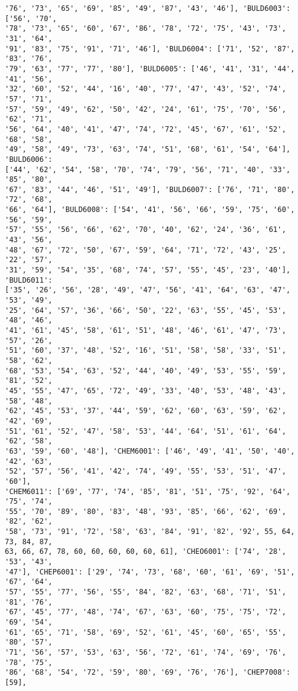 \documentclass[11pt]{article}
\begin{document}
\begin{Verbatim}[commandchars=\\\{\}]
'76', '73', '65', '69', '85', '49', '87', '43', '46'], 'BULD6003': ['56', '70',
'78', '73', '65', '60', '67', '86', '78', '72', '75', '43', '73', '31', '64',
'91', '83', '75', '91', '71', '46'], 'BULD6004': ['71', '52', '87', '83', '76',
'79', '63', '77', '77', '80'], 'BULD6005': ['46', '41', '31', '44', '41', '56',
'32', '60', '52', '44', '16', '40', '77', '47', '43', '52', '74', '57', '71',
'57', '59', '49', '62', '50', '42', '24', '61', '75', '70', '56', '62', '71',
'56', '64', '40', '41', '47', '74', '72', '45', '67', '61', '52', '68', '58',
'49', '58', '49', '73', '63', '74', '51', '68', '61', '54', '64'], 'BULD6006':
['44', '62', '54', '58', '70', '74', '79', '56', '71', '40', '33', '85', '80',
'67', '83', '44', '46', '51', '49'], 'BULD6007': ['76', '71', '80', '72', '68',
'66', '64'], 'BULD6008': ['54', '41', '56', '66', '59', '75', '60', '56', '59',
'57', '55', '56', '66', '62', '70', '40', '62', '24', '36', '61', '43', '56',
'48', '67', '72', '50', '67', '59', '64', '71', '72', '43', '25', '22', '57',
'31', '59', '54', '35', '68', '74', '57', '55', '45', '23', '40'], 'BULD6011':
['35', '26', '56', '28', '49', '47', '56', '41', '64', '63', '47', '53', '49',
'25', '64', '57', '36', '66', '50', '22', '63', '55', '45', '53', '48', '46',
'41', '61', '45', '58', '61', '51', '48', '46', '61', '47', '73', '57', '26',
'51', '60', '37', '48', '52', '16', '51', '58', '58', '33', '51', '58', '62',
'68', '53', '54', '63', '52', '44', '40', '49', '53', '55', '59', '81', '52',
'45', '55', '47', '65', '72', '49', '33', '40', '53', '48', '43', '58', '48',
'62', '45', '53', '37', '44', '59', '62', '60', '63', '59', '62', '42', '69',
'51', '61', '52', '47', '58', '53', '44', '64', '51', '61', '64', '62', '58',
'63', '59', '60', '48'], 'CHEM6001': ['46', '49', '41', '50', '40', '42', '63',
'52', '57', '56', '41', '42', '74', '49', '55', '53', '51', '47', '60'],
'CHEM6011': ['69', '77', '74', '85', '81', '51', '75', '92', '64', '75', '74',
'55', '70', '89', '80', '83', '48', '93', '85', '66', '62', '69', '82', '62',
'58', '73', '91', '72', '58', '63', '84', '91', '82', '92', 55, 64, 73, 84, 87,
63, 66, 67, 78, 60, 60, 60, 60, 60, 61], 'CHEO6001': ['74', '28', '53', '43',
'47'], 'CHEP6001': ['29', '74', '73', '68', '60', '61', '69', '51', '67', '64',
'57', '55', '77', '56', '55', '84', '82', '63', '68', '71', '51', '81', '76',
'67', '45', '77', '48', '74', '67', '63', '60', '75', '75', '72', '69', '54',
'61', '65', '71', '58', '69', '52', '61', '45', '60', '65', '55', '80', '57',
'71', '56', '57', '53', '63', '56', '72', '61', '74', '69', '76', '78', '75',
'86', '68', '54', '72', '59', '80', '69', '76', '76'], 'CHEP7008': [59],

\end{Verbatim}
\end{document}
